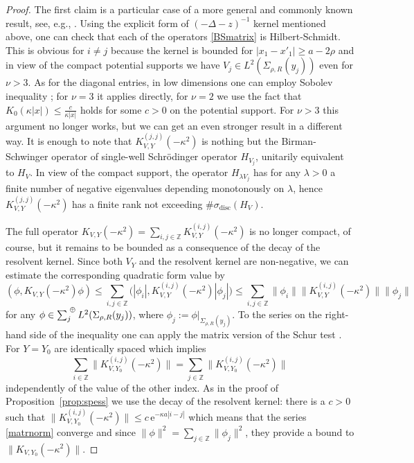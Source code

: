 \documentclass{article}
\numberwithin{equation}{section}
\theoremstyle{definition}
\newcommand{\e}{\mathrm{e}}
\newcommand{\Z}{\mathbb{Z}}
\newcommand{\sumoplus}{\!\raisebox{1.5ex}{{\scriptsize $\oplus$}}}
\begin{document}
\begin{proof}
The first claim is a particular case of a more general and commonly known result, see, e.g., \cite{BGRS97}. Using the explicit form of $(-\Delta-z)^{-1}$ kernel mentioned above, one can check that each of the operators \eqref{BSmatrix} is Hilbert-Schmidt. This is obvious for $i\ne j$ because the kernel is bounded for $|x_1-x'_1|\ge a-2\rho$ and in view of the compact potential supports we have $V_j\in L^2(\Sigma_{\rho,R}(y_j))$ even for $\nu>3$. As for the diagonal entries, in low dimensions one can employ Sobolev inequality \cite[Sec.~IX.4]{RS}; for $\nu=3$ it applies directly, for $\nu=2$ we use the fact that $K_0(\kappa|x|)\le \frac{c}{\kappa|x|}$ holds for some $c>0$ on the potential support. For $\nu>3$ this argument no longer works, but we can get an even stronger result in a different way. It is enough to note that $K_{V,Y}^{(j,j)}(-\kappa^2)$ is nothing but the Birman-Schwinger operator of single-well Schr\"odinger operator $H_{V_j}$, unitarily equivalent to $H_V$. In view of the compact support, the operator $H_{\lambda V_j}$ has for any $\lambda>0$ a finite number of negative eigenvalues depending monotonously on $\lambda$, hence $K_{V,Y}^{(j,j)}(-\kappa^2)$ has a finite rank not exceeding $\#\sigma_\mathrm{disc}(H_V)$.

The full operator $K_{V,Y}(-\kappa^2) = \sum_{i,j\in\Z} K_{V,Y}^{(i,j)}(-\kappa^2)$ is no longer compact, of course, but it remains to be bounded as a consequence of the decay of the resolvent kernel. Since both $V_Y$ and the resolvent kernel are non-negative, we can estimate the corresponding quadratic form value by
\begin{equation*}
(\phi, K_{V,Y}(-\kappa^2)\phi) \le \sum_{i,j\in\Z} \big(|\phi_i|, K_{V,Y}^{(i,j)}(-\kappa^2) |\phi_j|\big) \le \sum_{i,j\in\Z} \|\phi_i\| \|K_{V,Y}^{(i,j)}(-\kappa^2)\| \|\phi_j\|
\end{equation*}
for any $\phi\in \sum_j{\!\sumoplus}\: L^2(\Sigma_{\rho,R}(y_j))$, where $\phi_j:= \phi|_{\Sigma_{\rho,R}(y_j)}$. To the series on the right-hand side of the inequality one can apply the matrix version of the Schur test \cite[Sec.~II.1]{Co97}. For $Y=Y_0$ are identically spaced which implies
\begin{equation} \label{matrnorm}
\sum_{i\in\Z} \|K_{V,Y_0}^{(i,j)}(-\kappa^2)\| = \sum_{j\in\Z} \|K_{V,Y_0}^{(i,j)}(-\kappa^2)\|
\end{equation}
independently of the value of the other index. As in the proof of Proposition~\ref{prop:spess} we use the decay of the resolvent kernel: there is a $c>0$ such that $\|K_{V,Y_0}^{(i,j)}(-\kappa^2)\| \le c\,\e^{-\kappa a|i-j|}$ which means that the series \eqref{matrnorm} converge and since $\|\phi\|^2 = \sum_{j\in\Z} \|\phi_j\|^2$, they provide a bound to $\|K_{V,Y_0}(-\kappa^2)\|$.


\end{proof}
\end{document}
